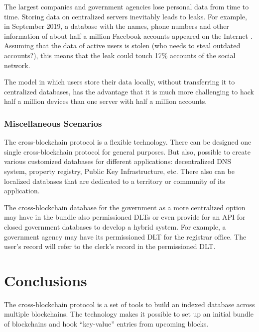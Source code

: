 \begin{multicols}{2}
\vspace{.2cm}
The largest companies and government agencies lose personal data from time to time. Storing data on centralized servers inevitably leads to leaks. For example, in September 2019, a database with the names, phone numbers and other information of about half a million Facebook accounts appeared on the Internet \cite{art1-key50}. Assuming that the data of active users \cite{art1-key51} is stolen (who needs to steal outdated accounts?), this means that the leak could touch 17\% accounts of the social network.

The model in which users store their data locally, without transferring it to centralized databases, has the advantage that it is much more challenging to hack half a million devices than one server with half a million accounts.

\vspace{-.5cm}

\subsubsection{Miscellaneous Scenarios}\label{subsubsec-5.2.e}

\vspace{-.3cm}

The cross-blockchain protocol is a flexible technology. There can be designed one single cross-blockchain protocol for general purposes. But also, possible to create various customized databases for different applications: decentralized DNS system, property registry, Public Key Infrastructure, etc. There also can be localized databases that are dedicated to a territory or community of its application.

The cross-blockchain database for the government as a more centralized option may have in the bundle also permissioned DLTs or even provide for an API for closed government databases to develop a hybrid system. For example, a government agency may have its permissioned DLT for the registrar office. The user’s record will refer to the clerk’s record in the permissioned DLT.

\section{Conclusions}\label{sec-6}

The cross-blockchain protocol is a set of tools to build an indexed database across multiple blockchains. The technology makes it possible to set up an initial bundle of blockchains and hook “key-value” entries from upcoming blocks.


\end{multicols}
